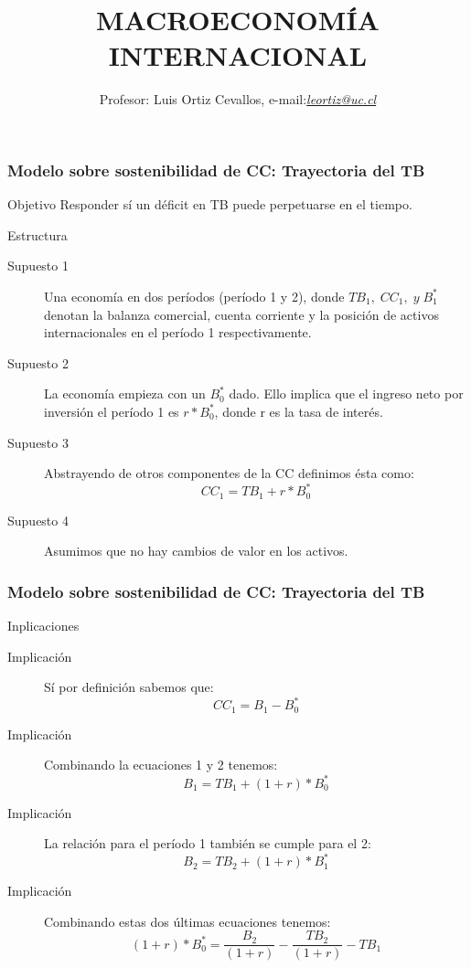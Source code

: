 \documentclass[10pt, xcolor=table, x11names]{beamer}
\author[Luis Ortiz Cevallos e-mail: \href{leortiz@uc.cl}{\textit{leortiz@uc.cl}}]{Profesor: Luis Ortiz Cevallos, e-mail:\href{leortiz@uc.cl}{\textit{leortiz@uc.cl}} }
\title[MACRO INTERNACIONAL]{\vspace*{1.0em} MACROECONOMÍA INTERNACIONAL}
\date[\href{https://ortiz-cevallos.github.io/luisortiz.github.io/ }{\textit{https://ortiz-cevallos.github.io/luisortiz.github.io/}}]{}
\begin{document}
\begin{frame}
\titlepage
\end{frame}




\begin{frame}[label=INTRODUCCION]
	\frametitle{{\normalsize Modelo sobre sostenibilidad de CC: Trayectoria del TB} {}}
	\begin{block} {Objetivo}
	Responder sí un déficit en TB puede perpetuarse en el tiempo.\\	
	\end{block}	
	\begin{block} {Estructura}
	\begin{description}
		\item[Supuesto 1] Una economía en dos períodos (período 1 y 2), donde $TB_{1}, \; CC_{1}, \; y \; B_{1}^{*} $ denotan la balanza comercial, cuenta corriente y la posición de activos internacionales en el período 1 respectivamente.
		\item[Supuesto 2] La economía empieza con un $B_{0}^{*}$ dado. Ello implica que el ingreso neto por inversión el período 1 es $r*B_{0}^{*} $, donde r es la tasa de interés.
		\item[Supuesto 3] Abstrayendo de otros componentes de la CC definimos ésta como:\\
		\begin{equation}
		CC_{1}=TB_{1}+r*B_{0}^{*}
		\end{equation}
		\item[Supuesto 4] Asumimos que no hay cambios de valor en los activos.
	\end{description}
	\end{block}	
\end{frame}

\begin{frame}[label=MODELO]
	\frametitle{{\normalsize Modelo sobre sostenibilidad de CC: Trayectoria del TB} {}}
\begin{block} {Inplicaciones }
	\begin{description}
		\item[Implicación] Sí por definición sabemos que:
		 \begin{equation}
		 CC_{1}=B_{1}-B_{0}^{*}
		 \end{equation}
		 \item[Implicación] Combinando la ecuaciones 1 y 2 tenemos:
		 \begin{equation}
		 B_{1}=TB_{1}+(1+r)*B_{0}^{*}
		 \end{equation}
		 \item[Implicación] La relación para el período 1 también se cumple para el 2:
		 \begin{equation}
		 B_{2}=TB_{2}+(1+r)*B_{1}^{*}
		 \end{equation}
		  \item[Implicación] Combinando estas dos últimas ecuaciones tenemos:
		  \begin{equation}
		  (1+r)*B_{0}^{*}= \frac{B_{2}}{(1+r)}-\frac{TB_{2}}{(1+r)}-TB_{1}
		  \end{equation}
	\end{description}
\end{block}		
\end{frame}
	
\end{document}
